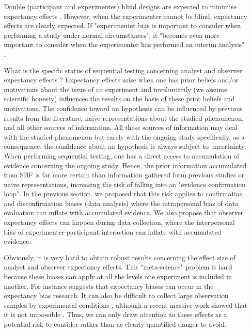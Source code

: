 \documentclass[a4paper,man,natbib,floatsintext,donotrepeattitle]{apa6}
\begin{document}
Double (participant and experimenter) blind designs are expected to minimise expectancy effects \citep{klein_low_2012,gilder_role_2018}. However, when the experimenter cannot be blind, expectancy effects are clearly expected. If "experimenter bias is important to consider when
performing a study under normal circumstances", it "becomes even more important to consider
when the experimenter has performed an interim analysis" \cite{lakens_performing_2014}. \par

What is the specific status of sequential testing concerning analyst and observer expectancy effects ? Expectancy effects arise when one has prior beliefs and/or motivations about the issue of an experiment and involuntarily (we assume scientific honesty) influences the results on the basis of these prior beliefs and motivations. The confidence toward an hypothesis can be influenced by previous results from the literature, naive representations about the studied phenomenon, and all other sources of information. All these sources of information may deal with the studied phenomenon but rarely with the ongoing study specifically, as a consequence, the confidence about an hypothesis is always subject to uncertainty. When performing sequential testing, one has a direct access to accumulation of evidence concerning the ongoing study. Hence, the prior information accumulated from SBF is far more certain than information gathered form previous studies or naive representations, increasing the risk of falling into an "evidence confirmation loop". In the previous section, we proposed that this risk applies to confirmation and disconfirmation biases (data analysis) where the intrapersonal bias of data evaluation can inflate with accumulated evidence. We also propose that observer expectancy effects can happen during data collection, where the interpersonal bias of experimenter-participant interaction can inflate with accumulated evidence. 

Obviously, it is very hard to obtain robust results concerning the effect size of analyst and observer expectancy effects. This "meta-science" problem is hard because these biases can apply at all the levels one experiment is included in another. For instance \cite{barber_expecting_1978} suggests that expectancy biases can occur in the expectancy bias research. It can also be difficult to collect large observation samples by experimental conditions \citep[e.g.,][]{zoble_interaction_1969}, although a recent massive work showed that it is not impossible \citep {gilder_role_2018}. Thus, we can only draw attention to these effects as a potential risk to consider rather than as clearly quantified danger to avoid.
\end{document}
